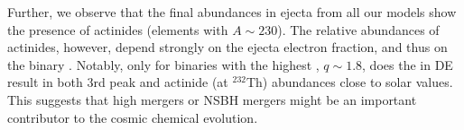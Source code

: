 Further, we observe that the final abundances in ejecta from all our models show 
the presence of actinides (elements with $A \sim 230$). 
The relative abundances of actinides, however, depend strongly on the ejecta 
electron fraction, and thus on the binary \mr{}.
Notably, only for binaries with the highest \mr{}, $q\sim1.8$, does the \rproc{} in \ac{DE} result in both $3$rd peak and actinide (at $^{232}$Th) abundances 
close to solar values.
This suggests that  high \mr{} mergers or \ac{NSBH} mergers might be an 
important contributor to the cosmic chemical evolution.




